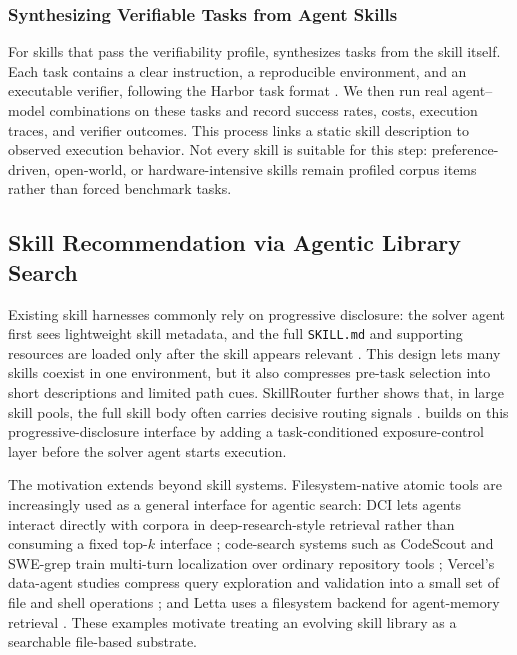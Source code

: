 \subsubsection{Synthesizing Verifiable Tasks from Agent Skills}
For skills that pass the verifiability profile, \ours synthesizes tasks from the skill itself. Each task contains a clear instruction, a reproducible environment, and an executable verifier, following the Harbor task format \citep{harborFramework}. We then run real agent--model combinations on these tasks and record success rates, costs, execution traces, and verifier outcomes. This process links a static skill description to observed execution behavior. Not every skill is suitable for this step: preference-driven, open-world, or hardware-intensive skills remain profiled corpus items rather than forced benchmark tasks.

\subsection{Skill Recommendation via Agentic Library Search}

Existing skill harnesses commonly rely on progressive disclosure: the solver agent first sees lightweight skill metadata, and the full \texttt{SKILL.md} and supporting resources are loaded only after the skill appears relevant \citep{openai2026codexSkills,anthropic2026claudeCodeSkills,agentSkills}. This design lets many skills coexist in one environment, but it also compresses pre-task selection into short descriptions and limited path cues. SkillRouter further shows that, in large skill pools, the full skill body often carries decisive routing signals \citep{zheng2026skillrouter}. \ours builds on this progressive-disclosure interface by adding a task-conditioned exposure-control layer before the solver agent starts execution.

The motivation extends beyond skill systems. Filesystem-native atomic tools are increasingly used as a general interface for agentic search: DCI lets agents interact directly with corpora in deep-research-style retrieval rather than consuming a fixed top-$k$ interface \citep{li2026beyond}; code-search systems such as CodeScout and SWE-grep train multi-turn localization over ordinary repository tools \citep{sutawika2026codescout,pan2025swegrep}; Vercel's data-agent studies compress query exploration and validation into a small set of file and shell operations \citep{qu2025we,goyal2026testing}; and Letta uses a filesystem backend for agent-memory retrieval \citep{letta2025benchmarking}. These examples motivate treating an evolving skill library as a searchable file-based substrate.

